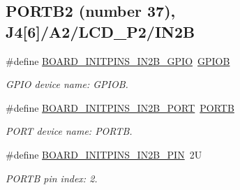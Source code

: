 \subsection*{P\+O\+R\+T\+B2 (number 37), J4\mbox{[}6\mbox{]}/\+A2/\+L\+C\+D\+\_\+\+P2/\+I\+N2B}
\begin{DoxyCompactItemize}
\item 
\mbox{\label{group__pin__mux_gaa65ebf2323099971fa0ca6da6c884b99}} 
\#define \mbox{\hyperlink{group__pin__mux_gaa65ebf2323099971fa0ca6da6c884b99}{B\+O\+A\+R\+D\+\_\+\+I\+N\+I\+T\+P\+I\+N\+S\+\_\+\+I\+N2\+B\+\_\+\+G\+P\+IO}}~\mbox{\hyperlink{group___g_p_i_o___peripheral___access___layer_ga68b66ac73be4c836db878a42e1fea3cd}{G\+P\+I\+OB}}
\begin{DoxyCompactList}\small\item\em G\+P\+IO device name\+: G\+P\+I\+OB. \end{DoxyCompactList}\item 
\mbox{\label{group__pin__mux_ga4328a0bb2a80f9f10be6168a64ca2815}} 
\#define \mbox{\hyperlink{group__pin__mux_ga4328a0bb2a80f9f10be6168a64ca2815}{B\+O\+A\+R\+D\+\_\+\+I\+N\+I\+T\+P\+I\+N\+S\+\_\+\+I\+N2\+B\+\_\+\+P\+O\+RT}}~\mbox{\hyperlink{group___p_o_r_t___peripheral___access___layer_ga09a0c85cd3da09d9cdf63a5ac4c39f77}{P\+O\+R\+TB}}
\begin{DoxyCompactList}\small\item\em P\+O\+RT device name\+: P\+O\+R\+TB. \end{DoxyCompactList}\item 
\mbox{\label{group__pin__mux_ga9fc31a6fd63b7b3516ae4af4a12817bd}} 
\#define \mbox{\hyperlink{group__pin__mux_ga9fc31a6fd63b7b3516ae4af4a12817bd}{B\+O\+A\+R\+D\+\_\+\+I\+N\+I\+T\+P\+I\+N\+S\+\_\+\+I\+N2\+B\+\_\+\+P\+IN}}~2U
\begin{DoxyCompactList}\small\item\em P\+O\+R\+TB pin index\+: 2. \end{DoxyCompactList}\end{DoxyCompactItemize}
